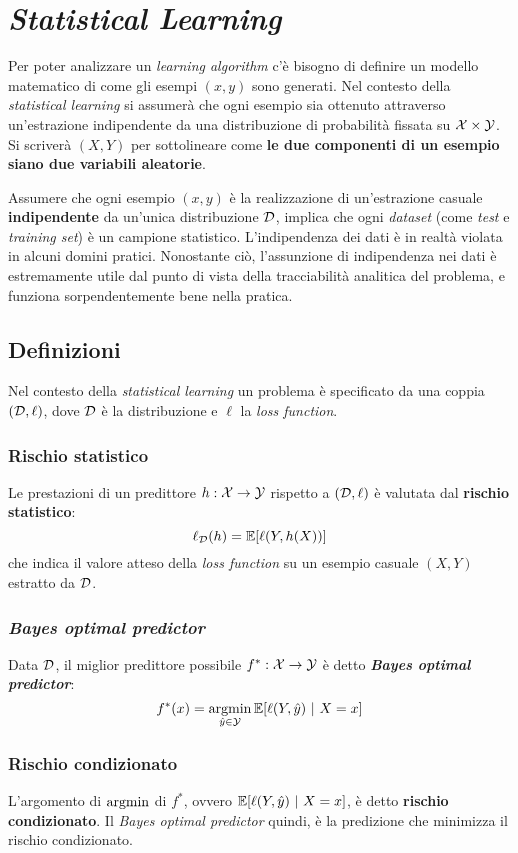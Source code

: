 \section{\textit{Statistical Learning}}

Per poter analizzare un \textit{learning algorithm} c'è bisogno di definire un modello
matematico di come gli esempi $(x,y)$ sono generati. Nel contesto della \textit{statistical
learning} si assumerà che ogni esempio sia ottenuto attraverso un'estrazione indipendente
da una distribuzione di probabilità fissata su $\mathcal{X} \times \mathcal{Y}$. Si scriverà $(X,Y)$ per
sottolineare come \textbf{le due componenti di un esempio siano due variabili aleatorie}.

Assumere che ogni esempio $(x,y)$ è la realizzazione di un'estrazione casuale 
\textbf{indipendente} da un'unica distribuzione $\mathcal{D}$, implica che ogni \textit{dataset} 
(come \textit{test} e \textit{training set}) è un campione statistico. L'indipendenza dei
dati è in realtà violata in alcuni domini pratici. Nonostante ciò, l'assunzione di indipendenza
nei dati è estremamente utile dal punto di vista della tracciabilità analitica del problema,
e funziona sorpendentemente bene nella pratica.

\subsection{Definizioni}
Nel contesto della \textit{statistical learning} un problema è specificato da una coppia
$(\mathcal{D},\ell)$, dove $\mathcal{D}$ è la distribuzione e $\ell$ la \textit{loss function}.

\subsubsection{Rischio statistico}
Le prestazioni di un predittore $h:\mathcal{X} \rightarrow \mathcal{Y}$ rispetto a $(\mathcal{D},\ell)$ è valutata dal
\textbf{rischio statistico}:
$$ \ell_{\mathcal{D}}(h) = \mathbb{E}[\ell(Y,h(X))] $$
che indica il valore atteso della \textit{loss function} su un esempio casuale $(X,Y)$
estratto da $\mathcal{D}$.

\subsubsection{\textit{Bayes optimal predictor}}
Data $\mathcal{D}$, il miglior predittore possibile $f^*:\mathcal{X} \rightarrow \mathcal{Y}$ è detto 
\textbf{\textit{Bayes optimal predictor}}:
$$ f^*(x) = \operatorname*{argmin}_{\hat{y} \in \mathcal{Y}} \mathbb{E}[\ell(Y,\hat{y})\ | \ X=x] $$

\subsubsection{Rischio condizionato}
L'argomento di $\operatorname*{argmin}$ di $f^*$, ovvero $\mathbb{E}[\ell(Y,\hat{y})\ | \ X=x]$, è detto
\textbf{rischio condizionato}. Il \textit{Bayes optimal predictor} quindi, è la predizione
che minimizza il rischio condizionato.